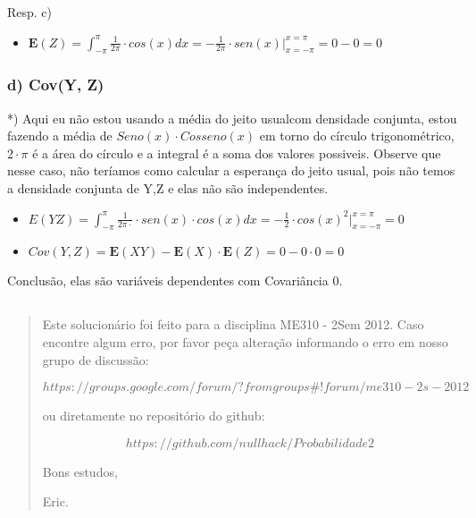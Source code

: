\documentclass[portuguese]{article}
\begin{document}
Resp. c)
\begin{itemize}
\item $\mathbf{E}(Z)=\int_{-\pi}^{\pi}\frac{1}{2\pi}\cdot cos(x)dx=-\frac{1}{2\pi}\cdot sen(x)|_{x=-\pi}^{x=\pi}=0-0=0$
\end{itemize}

\subsubsection*{\textmd{d) Cov(Y, Z)}}

{*}) Aqui eu não estou usando a média do jeito usualcom densidade
conjunta, estou fazendo a média de $Seno(x)\cdot Cosseno(x)$ em torno
do círculo trigonométrico, $2\cdot\pi$ é a área do círculo e a integral
é a soma dos valores possiveis. Observe que nesse caso, não teríamos
como calcular a esperança do jeito usual, pois não temos a densidade
conjunta de Y,Z e elas não são independentes.
\begin{itemize}
\item $E(YZ)=\int_{-\pi}^{\pi}\frac{1}{2\pi\cdot}\cdot sen(x)\cdot cos(x)dx=-\frac{1}{2}\cdot cos(x)^{2}|_{x=-\pi}^{x=\pi}=0$
\item $Cov(Y,Z)=\mathbf{E}(XY)-\mathbf{E}(X)\cdot\mathbf{E}(Z)=0-0\cdot0=0$
\end{itemize}
Conclusão, elas são variáveis dependentes com Covariância 0.


\subsection*{\textcompwordmark{}}


\subsubsection*{\pagebreak{}}
\begin{quotation}
Este solucionário foi feito para a disciplina ME310 - 2Sem 2012. Caso
encontre algum erro, por favor peça alteração informando o erro em
nosso grupo de discussão: 

$$https://groups.google.com/forum/?fromgroups\#!forum/me310-2s-2012$$

ou diretamente no repositório do github:

$$https://github.com/nullhack/Probabilidade2$$

Bons estudos,

Eric.\end{quotation}
\end{document}
